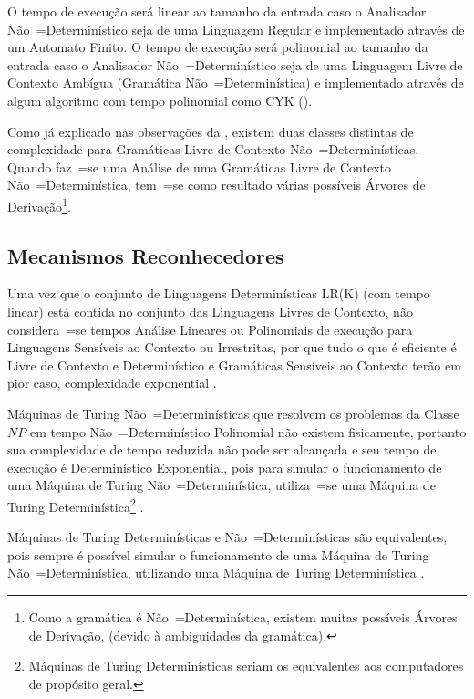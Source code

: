 O tempo de execução será linear ao tamanho da entrada caso o Analisador Não~=Determinístico seja de uma Linguagem Regular e
implementado através de um Automato Finito.
O tempo de execução será polinomial ao tamanho da entrada caso o Analisador Não~=Determinístico seja de uma Linguagem Livre de Contexto Ambígua (Gramática Não~=Determinística) e
implementado através de algum algoritmo com tempo polinomial como CYK ().

Como já explicado nas observações da ,
existem duas classes distintas de complexidade para Gramáticas Livre de Contexto Não~=Determinísticas.
Quando faz~=se uma Análise de uma Gramáticas Livre de Contexto Não~=Determinística,
tem~=se como resultado várias possíveis Árvores de Derivação\footnote{
Como a gramática é Não~=Determinística,
existem muitas possíveis Árvores de Derivação,
(devido à ambiguidades da gramática).
}.


\subsection{Mecanismos Reconhecedores}
\label{mecanismosReconhecedores}

Uma vez que o conjunto de Linguagens Determinísticas LR(K) (com tempo linear) está contida no conjunto das Linguagens Livres de Contexto,
não considera~=se tempos Análise Lineares ou
Polinomiais de execução para Linguagens Sensíveis ao Contexto ou
Irrestritas,
por que tudo o que é eficiente é Livre de Contexto e
Determinístico e
Gramáticas Sensíveis ao Contexto terão em pior caso,
complexidade exponential \cite{growingContextSensitiveLanguages}.

Máquinas de Turing Não~=Determinísticas que resolvem os problemas da Classe $NP$ em tempo Não~=Determinístico Polinomial não existem fisicamente,
portanto sua complexidade de tempo reduzida não pode ser alcançada e
seu tempo de execução é Determinístico Exponential,
pois para simular o funcionamento de uma Máquina de Turing Não~=Determinística,
utiliza~=se uma Máquina de Turing Determinística\footnote{
Máquinas de Turing Determinísticas seriam os equivalentes aos computadores de propósito geral.
}
\cite{sipserBook,turingMachinesRoyer}.

Máquinas de Turing Determinísticas e
Não~=Determinísticas são equivalentes,
pois sempre é possível simular o funcionamento de uma Máquina de Turing Não~=Determinística,
utilizando uma Máquina de Turing Determinística \cite{hopcroftBook}.

